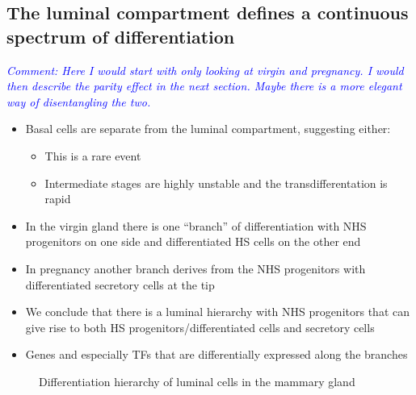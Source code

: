\documentclass[oneside]{amsart}
\newcommand{\comment}[1]{\textit{\textcolor{blue}{Comment: #1}}}
\begin{document}
\subsection{The luminal compartment defines a continuous spectrum of differentiation\label{sec:LumDiff}}
\comment{Here I would start with only looking at virgin and pregnancy. 
I would then describe the parity effect in the next section. Maybe there is a more elegant way of disentangling the two.}
\begin{itemize}
    \item Basal cells are separate from the luminal compartment, suggesting either:
	\begin{itemize}
	    \item This is a rare event 
	    \item Intermediate stages are highly unstable and the transdifferentation is rapid
	\end{itemize}
    \item In the virgin gland there is one ``branch'' of differentiation with NHS progenitors on one side and differentiated HS cells on the other end
    \item In pregnancy another branch derives from the NHS progenitors with differentiated secretory cells at the tip
    \item We conclude that there is a luminal hierarchy with NHS progenitors that can give rise to both HS progenitors/differentiated cells and secretory cells
    \item Genes and especially TFs that are differentially expressed along the branches
\end{itemize}

\begin{figure}[h]
\begin{subfigure}{0.45\linewidth}
\centering %
\caption{}
\end{subfigure}
\begin{subfigure}{0.45\linewidth}
\caption{}
\end{subfigure}
\begin{subfigure}{0.45\linewidth}
\centering %
\caption{}
\end{subfigure}
\caption{Differentiation hierarchy of luminal cells in the mammary gland}
      \label{fig:f2}
  \end{figure}
  
\end{document}
